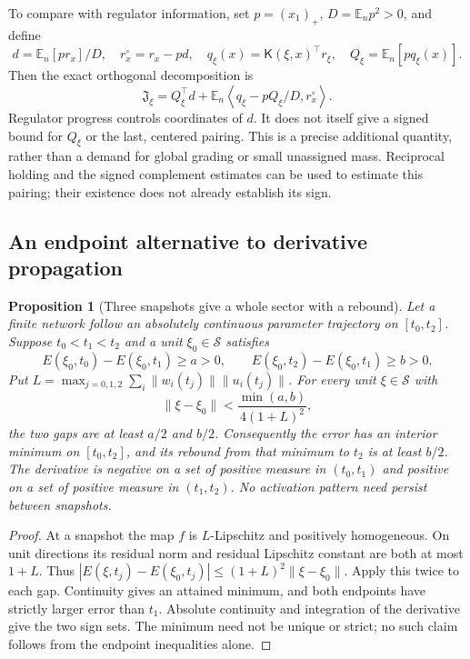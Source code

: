 \documentclass{article} %
\theoremstyle{plain}
\newtheorem{proposition}[theorem]{Proposition}
\theoremstyle{definition}
\theoremstyle{remark}
\begin{document}
To compare with regulator information, set $p=(x_1)_+$,
$D=\mathbb E_n p^2>0$, and define
\[
 d=\mathbb E_n[pr_x]/D,\quad r_x^\circ=r_x-pd,\quad
 q_\xi(x)=\mathsf K(\xi,x)^\top r_\xi,\quad
 Q_\xi=\mathbb E_n[pq_\xi(x)].
\]
Then the exact orthogonal decomposition is
\begin{equation}\label{sbaudit:regulator-split}
 \mathfrak J_\xi=Q_\xi^\top d+
 \mathbb E_n\left\langle q_\xi-pQ_\xi/D,r_x^\circ\right\rangle.
\end{equation}
Regulator progress controls coordinates of $d$. It does not itself give
a signed bound for $Q_\xi$ or the last, centered pairing. This is a precise
additional quantity, rather than a demand for global grading or small
unassigned mass. Reciprocal holding and the signed complement estimates
can be used to estimate this pairing; their existence does not already
establish its sign.

\subsection{An endpoint alternative to derivative propagation}

\begin{proposition}[Three snapshots give a whole sector with a rebound]
\label{sbaudit:secants}
Let a finite network follow an absolutely continuous parameter trajectory
on $[t_0,t_2]$. Suppose $t_0<t_1<t_2$ and a unit $\xi_0\in\mathcal S$
satisfies
\begin{equation}\label{sbaudit:two-gaps}
 E(\xi_0,t_0)-E(\xi_0,t_1)\ge a>0,\qquad
 E(\xi_0,t_2)-E(\xi_0,t_1)\ge b>0.
\end{equation}
Put $L=\max_{j=0,1,2}\sum_i\|w_i(t_j)\|\|u_i(t_j)\|$.
For every unit $\xi\in\mathcal S$ with
\[
 \|\xi-\xi_0\|<\frac{\min(a,b)}{4(1+L)^2},
\]
the two gaps are at least $a/2$ and $b/2$. Consequently the error has an
interior minimum on $[t_0,t_2]$, and its rebound from that minimum to $t_2$
is at least $b/2$. The derivative is negative on a set of positive measure
in $(t_0,t_1)$ and positive on a set of positive measure in $(t_1,t_2)$.
No activation pattern need persist between snapshots.
\end{proposition}
\begin{proof}
At a snapshot the map $f$ is $L$-Lipschitz and positively homogeneous.
On unit directions its residual norm and residual Lipschitz constant are
both at most $1+L$. Thus
$|E(\xi,t_j)-E(\xi_0,t_j)|\le(1+L)^2\|\xi-\xi_0\|$.
Apply this twice to each gap. Continuity gives an attained minimum,
and both endpoints have strictly larger error than $t_1$. Absolute
continuity and integration of the derivative give the two sign sets.
The minimum need not be unique or strict; no such claim follows from
the endpoint inequalities alone.
\end{proof}
\end{document}

